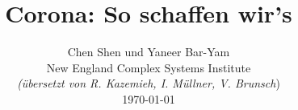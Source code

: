 \documentclass[onecolumn,journal]{IEEEtran}
\begin{document}
\title{\color{Brown} Corona: So schaffen wir’s \\
\vspace{-0.35ex}}
\author{Chen Shen und Yaneer Bar-Yam \\ New England Complex Systems Institute \\
\vspace{+0.35ex}
\small{\textit{(übersetzt von R. Kazemieh, I. Müllner, V. Brunsch})}\\
 \today 
  \vspace{-14ex} \\ 

   
\bigskip
\bigskip

\textbf{}
 }
    
\maketitle


\flushbottom %



\thispagestyle{empty} %




\renewcommand{\thefootnote}{\fnsymbol{footnote}}
\end{document}

